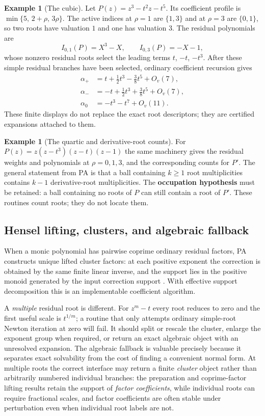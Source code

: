 \documentclass[11pt,letterpaper]{article}
\numberwithin{equation}{section}
\theoremstyle{definition}
\newtheorem{example}[theorem]{Example}
\theoremstyle{remark}
\newcommand{\Ov}[1]{O_v(#1)}
\begin{document}
\begin{example}[The cubic]\label{cas:ex-cubic}
Let $P(z)=z^3-t^2z-t^5$. Its coefficient profile is $\min\{5,\,2+\rho,\,3\rho\}$.
The active indices at $\rho=1$ are $\{1,3\}$ and at $\rho=3$ are $\{0,1\}$, so
two roots have valuation $1$ and one has valuation $3$. The residual polynomials
are
\[
 I_{0,1}(P)=X^3-X,\qquad I_{0,3}(P)=-X-1,
\]
whose nonzero residual roots select the leading terms $t$, $-t$, $-t^3$. After
these simple residual branches have been selected, ordinary coefficient
recursion gives
\begin{align*}
 \alpha_+&=t+\tfrac12t^3-\tfrac38t^5+\Ov{7},\\
 \alpha_-&=-t+\tfrac12t^3+\tfrac38t^5+\Ov{7},\\
 \alpha_0&=-t^3-t^7+\Ov{11} .
\end{align*}
These finite displays do not replace the exact root descriptors; they are
certified expansions attached to them.
\end{example}

\begin{example}[The quartic and derivative-root counts]\label{cas:ex-quartic}
For $P(z)=z(z-t^3)(z-t)(z-1)$ the same machinery gives the residual weights and
polynomials at $\rho=0,1,3$, and the corresponding counts for $P'$. The general
statement from PA is that a ball containing $k\ge1$ root multiplicities contains
$k-1$ derivative-root multiplicities. The \textbf{occupation hypothesis} must be
retained: a ball containing no roots of $P$ can still contain a root of $P'$.
These routines count roots; they do not locate them.
\end{example}

\subsection{Hensel lifting, clusters, and algebraic fallback}
\label{cas:sub-hensel}
When a monic polynomial has pairwise coprime ordinary residual factors, PA
constructs unique lifted cluster factors: at each positive exponent the
correction is obtained by the same finite linear inverse, and the support lies
in the positive monoid generated by the input correction support
\cite{cas:SourcePolynomial}. With effective support decomposition this is an
implementable coefficient algorithm.

A \emph{multiple} residual root is different. For $z^m-t$ every root reduces to
zero and the first useful scale is $t^{1/m}$; a routine that only attempts
ordinary simple-root Newton iteration at zero will fail. It should split or
rescale the cluster, enlarge the exponent group when required, or return an
exact algebraic object with an unresolved expansion. The algebraic fallback is
valuable precisely because it separates exact solvability from the cost of
finding a convenient normal form. At multiple roots the correct interface may
return a finite \emph{cluster} object rather than arbitrarily numbered
individual branches: the preparation and coprime-factor lifting results retain
the support of \emph{factor coefficients}, while individual roots can require
fractional scales, and factor coefficients are often stable under perturbation
even when individual root labels are not.
\end{document}
